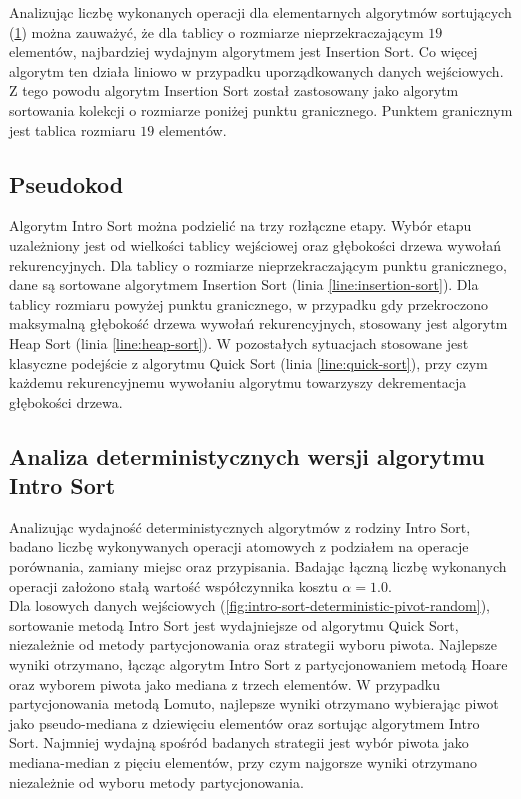 Analizując liczbę wykonanych operacji dla elementarnych algorytmów sortujących (\ref{fig:sorting-small-array}) można zauważyć, że dla tablicy o rozmiarze nieprzekraczającym $19$ elementów, najbardziej wydajnym algorytmem jest Insertion Sort. Co więcej algorytm ten działa liniowo w przypadku uporządkowanych danych wejściowych. Z tego powodu algorytm Insertion Sort został zastosowany jako algorytm sortowania kolekcji o rozmiarze poniżej punktu granicznego. Punktem granicznym jest tablica rozmiaru $19$ elementów.\\

\begin{figure}[]
	\centering
	
	\caption[]{}
	\label{fig:sorting-small-array}
\end{figure}

\subsection{Pseudokod}
Algorytm Intro Sort można podzielić na trzy rozłączne etapy. Wybór etapu uzależniony jest od wielkości tablicy wejściowej oraz głębokości drzewa wywołań rekurencyjnych. Dla tablicy o rozmiarze nieprzekraczającym punktu granicznego, dane są sortowane algorytmem Insertion Sort (linia \ref{line:insertion-sort}). Dla tablicy rozmiaru powyżej punktu granicznego, w przypadku gdy przekroczono maksymalną głębokość drzewa wywołań rekurencyjnych, stosowany jest algorytm Heap Sort (linia \ref{line:heap-sort}). W pozostałych sytuacjach stosowane jest klasyczne podejście z algorytmu Quick Sort (linia \ref{line:quick-sort}), przy czym każdemu rekurencyjnemu wywołaniu algorytmu towarzyszy dekrementacja głębokości drzewa.



\subsection{Analiza deterministycznych wersji algorytmu Intro Sort}
Analizując wydajność deterministycznych algorytmów z rodziny Intro Sort, badano liczbę wykonywanych operacji atomowych z podziałem na operacje porównania, zamiany miejsc oraz przypisania. Badając łączną liczbę wykonanych operacji założono stałą wartość współczynnika kosztu $\alpha = 1.0$.\\

Dla losowych danych wejściowych (\ref{fig:intro-sort-deterministic-pivot-random}), sortowanie metodą Intro Sort jest wydajniejsze od algorytmu Quick Sort, niezależnie od metody partycjonowania oraz strategii wyboru piwota. Najlepsze wyniki otrzymano, łącząc algorytm Intro Sort z partycjonowaniem metodą Hoare oraz wyborem piwota jako mediana z trzech elementów. W przypadku partycjonowania metodą Lomuto, najlepsze wyniki otrzymano wybierając piwot jako pseudo-mediana z dziewięciu elementów oraz sortując algorytmem Intro Sort. Najmniej wydajną spośród badanych strategii jest wybór piwota jako mediana-median z pięciu elementów, przy czym najgorsze wyniki otrzymano niezależnie od wyboru metody partycjonowania.\\

